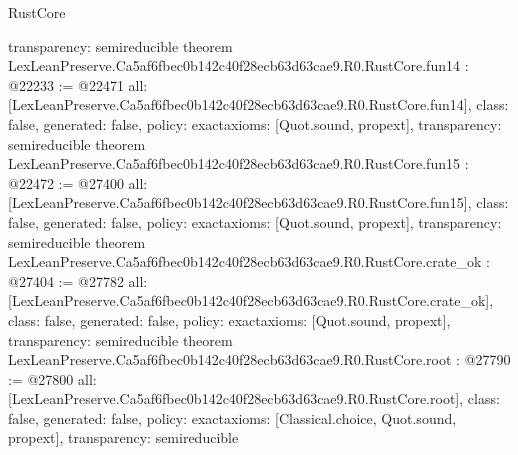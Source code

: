 \begin{lexlean}{RustCore}
\begin{coremodule}
{  transparency: semireducible
}
theorem LexLeanPreserve.Ca5af6fbec0b142c40f28ecb63d63cae9.R0.RustCore.fun14 : @22233 := @22471 {
  all: [LexLeanPreserve.Ca5af6fbec0b142c40f28ecb63d63cae9.R0.RustCore.fun14],
  class: false,
  generated: false,
  policy: exact{axioms: [Quot.sound, propext]},
  transparency: semireducible
}
theorem LexLeanPreserve.Ca5af6fbec0b142c40f28ecb63d63cae9.R0.RustCore.fun15 : @22472 := @27400 {
  all: [LexLeanPreserve.Ca5af6fbec0b142c40f28ecb63d63cae9.R0.RustCore.fun15],
  class: false,
  generated: false,
  policy: exact{axioms: [Quot.sound, propext]},
  transparency: semireducible
}
theorem LexLeanPreserve.Ca5af6fbec0b142c40f28ecb63d63cae9.R0.RustCore.crate_ok : @27404 := @27782 {
  all: [LexLeanPreserve.Ca5af6fbec0b142c40f28ecb63d63cae9.R0.RustCore.crate_ok],
  class: false,
  generated: false,
  policy: exact{axioms: [Quot.sound, propext]},
  transparency: semireducible
}
theorem LexLeanPreserve.Ca5af6fbec0b142c40f28ecb63d63cae9.R0.RustCore.root : @27790 := @27800 {
  all: [LexLeanPreserve.Ca5af6fbec0b142c40f28ecb63d63cae9.R0.RustCore.root],
  class: false,
  generated: false,
  policy: exact{axioms: [Classical.choice, Quot.sound, propext]},
  transparency: semireducible
}


\end{coremodule}
\end{lexlean}
